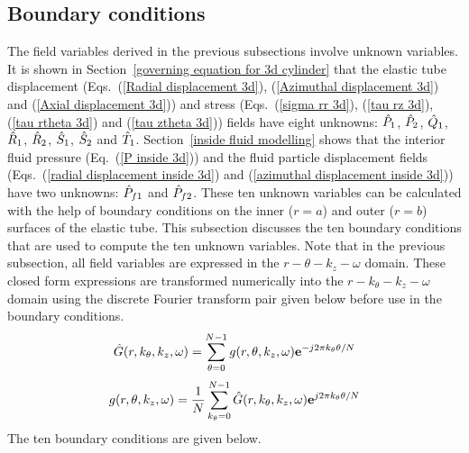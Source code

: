 \documentclass[11pt,cleanfoot]{asme2ej}
\begin{document}
\subsection{Boundary conditions}\label{BCS}
The field variables derived in the previous subsections involve unknown variables. It is shown in Section~\ref{governing equation for 3d cylinder} that the elastic tube displacement (Eqs.~(\ref{Radial displacement 3d}), (\ref{Azimuthal displacement 3d}) and (\ref{Axial displacement 3d})) and stress (Eqs.~(\ref{sigma rr 3d}), (\ref{tau rz 3d}), (\ref{tau rtheta 3d}) and (\ref{tau ztheta 3d})) fields have eight unknowns: $\Hat{P}_1$, $\Hat{P}_2$, $\Hat{Q}_1$, $\Hat{R}_1$, $\Hat{R}_2$, $\Hat{S}_1$, $\Hat{S}_2$ and $\Hat{T}_1$. Section~\ref{inside fluid modelling} shows that the interior fluid pressure (Eq.~(\ref{P inside 3d})) and the fluid particle displacement fields (Eqs.~(\ref{radial displacement inside 3d}) and (\ref{azimuthal displacement inside 3d})) have two unknowns: $\Hat{P}_{f1}$ and $\Hat{P}_{f2}$. These ten unknown variables can be calculated with the help of boundary conditions on the inner ($r=a$) and outer ($r=b$) surfaces of the elastic tube. This subsection discusses the ten boundary conditions that are used to compute the ten unknown variables. Note that in the previous subsection, all field variables are expressed in the $r-\theta-k_z-\omega$ domain. These closed form expressions are transformed numerically into the $r-k_\theta-k_z-\omega$ domain using the discrete Fourier transform pair given below before use in the boundary conditions.
\begin{equation}\label{Forward Fourier tranform theta}
    \Hat{G}(r,k_\theta,k_z,\omega) = \sum_{\theta=0}^{N-1} g(r,\theta,k_z,\omega)\mathbf{e}^{-j2\pi k_\theta\theta/N}
\end{equation}
\begin{equation}\label{Backward Fourier transform theta}
    g(r,\theta,k_z,\omega) = \frac{1}{N}\sum_{k_\theta = 0}^{N-1}\Hat{G}(r,k_\theta,k_z,\omega)\mathbf{e}^{j2\pi k_\theta \theta/N}
\end{equation}
The ten boundary conditions are given below.
\end{document}
